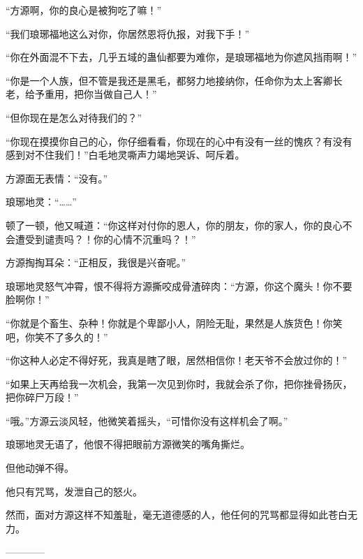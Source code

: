 \begin{this_body}
“方源啊，你的良心是被狗吃了嘛！”

“我们琅琊福地这么对你，你居然恩将仇报，对我下手！”

“你在外面混不下去，几乎五域的蛊仙都要为难你，是琅琊福地为你遮风挡雨啊！”

“你是一个人族，但不管是我还是黑毛，都努力地接纳你，任命你为太上客卿长老，给予重用，把你当做自己人！”

“但你现在是怎么对待我们的？”

“你现在摸摸你自己的心，你仔细看看，你现在的心中有没有一丝的愧疚？有没有感到对不住我们！”白毛地灵嘶声力竭地哭诉、呵斥着。

方源面无表情：“没有。”

琅琊地灵：“……”

顿了一顿，他又喊道：“你这样对付你的恩人，你的朋友，你的家人，你的良心不会遭受到谴责吗？！你的心情不沉重吗？！”

方源掏掏耳朵：“正相反，我很是兴奋呢。”

琅琊地灵怒气冲霄，恨不得将方源撕咬成骨渣碎肉：“方源，你这个魔头！你不要脸啊你！”

“你就是个畜生、杂种！你就是个卑鄙小人，阴险无耻，果然是人族货色！你笑吧，你笑不了多久的！”

“你这种人必定不得好死，我真是瞎了眼，居然相信你！老天爷不会放过你的！”

“如果上天再给我一次机会，我第一次见到你时，我就会杀了你，把你挫骨扬灰，把你碎尸万段！”

“哦。”方源云淡风轻，他微笑着摇头，“可惜你没有这样机会了啊。”

琅琊地灵无语了，他恨不得把眼前方源微笑的嘴角撕烂。

但他动弹不得。

他只有咒骂，发泄自己的怒火。

然而，面对方源这样不知羞耻，毫无道德感的人，他任何的咒骂都显得如此苍白无力。

------------

\end{this_body}

